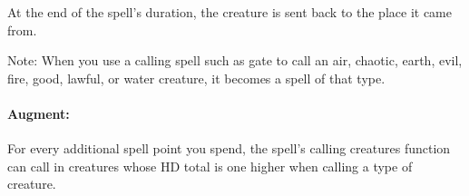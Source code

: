 \begin{list}{}{\leftmargin=1em}
At the end of the spell's duration, the creature is sent back to the place it came from.
% 
% 
% 

Note: When you use a calling spell such as gate to call an air, chaotic, earth, evil, fire, good, lawful, or water creature, it becomes a spell of that type.
\end{list}

\paragraph{Augment:} For every additional spell point you spend, 
the spell's calling creatures function can call in creatures whose HD total is one higher when calling a type of creature.


